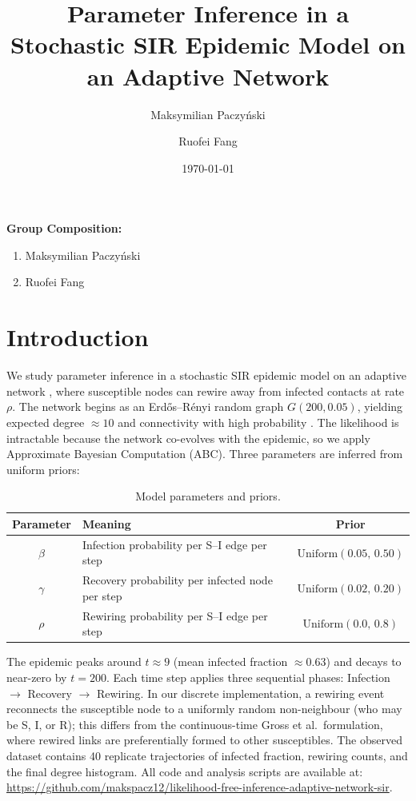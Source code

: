\documentclass[12pt]{article}
\begin{document}
\title{Parameter Inference in a Stochastic SIR Epidemic Model on an Adaptive Network}
\author{Maksymilian Paczyński \and Ruofei Fang}
\date{\today}
\maketitle

{\bf Group Composition:}
\begin{enumerate}
\item Maksymilian Paczyński
\item Ruofei Fang
\end{enumerate}

\section{Introduction}

We study parameter inference in a stochastic SIR epidemic model on an adaptive network \cite{GDB06}, where susceptible nodes can rewire away from infected contacts at rate $\rho$. The network begins as an Erdős–Rényi random graph $G(200, 0.05)$, yielding expected degree $\approx 10$ and connectivity with high probability \cite{Wik24}. The likelihood is intractable because the network co-evolves with the epidemic, so we apply Approximate Bayesian Computation (ABC). Three parameters are inferred from uniform priors:

\begin{table}[h]
\centering
\small
\begin{tabular}{clc}
\toprule
\textbf{Parameter} & \textbf{Meaning} & \textbf{Prior} \\
\midrule
$\beta$ & Infection probability per S--I edge per step & $\mathrm{Uniform}(0.05,\,0.50)$ \\
$\gamma$ & Recovery probability per infected node per step & $\mathrm{Uniform}(0.02,\,0.20)$ \\
$\rho$ & Rewiring probability per S--I edge per step & $\mathrm{Uniform}(0.0,\,0.8)$ \\
\bottomrule
\end{tabular}
\caption{Model parameters and priors.}
\end{table}

\noindent The epidemic peaks around $t \approx 9$ (mean infected fraction $\approx 0.63$) and decays to near-zero by $t=200$. Each time step applies three sequential phases: Infection $\to$ Recovery $\to$ Rewiring. In our discrete implementation, a rewiring event reconnects the susceptible node to a uniformly random non-neighbour (who may be S, I, or R); this differs from the continuous-time Gross et al.\ formulation, where rewired links are preferentially formed to other susceptibles. The observed dataset contains 40 replicate trajectories of infected fraction, rewiring counts, and the final degree histogram. All code and analysis scripts are available at: \url{https://github.com/makspacz12/likelihood-free-inference-adaptive-network-sir}.
\end{document}
